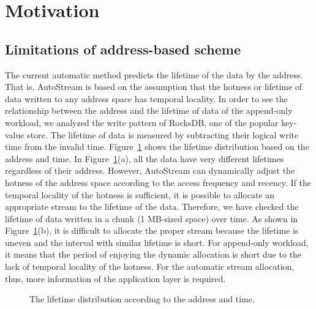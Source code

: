 \section{Motivation}
\subsection{Limitations of address-based scheme}
The current automatic method predicts the lifetime of the data by the address.
That is, AutoStream is based on the assumption that the hotness or lifetime of data 
written to any address space has temporal locality.
In order to see the relationship between the address and the lifetime of data of the append-only workload,
we analyzed the write pattern of RocksDB, one of the popular key-value store.
The lifetime of data is measured by subtracting their logical write time from the invalid time.
Figure~\ref{fig:lba_lifetime} shows the lifetime distribution based on the address and time.
In Figure~\ref{fig:lba_lifetime}(a), all the data have very different lifetimes regardless of their 
address.
However, AutoStream can dynamically adjust the hotness of the address space
according to the access frequency and recency.
If the temporal locality of the hotness is sufficient, 
it is possible to allocate an appropriate stream to the lifetime of the data.
Therefore, we have checked the lifetime of data written in a chunk (1 MB-sized space) over time.
As shown in Figure~\ref{fig:lba_lifetime}(b), it is difficult to allocate the proper stream 
because the lifetime is uneven and the interval with similar lifetime is short.
For append-only workload, it means that the period of enjoying the dynamic allocation is short 
due to the lack of temporal locality of the hotness.
For the automatic stream allocation, thus, more information of the application layer is required.

\begin{figure}[t]
	\centering
	\vspace{-10pt}
	\caption{The lifetime distribution according to the address and time.}
	\label{fig:lba_lifetime}
	\vspace{-15pt}
\end{figure}

